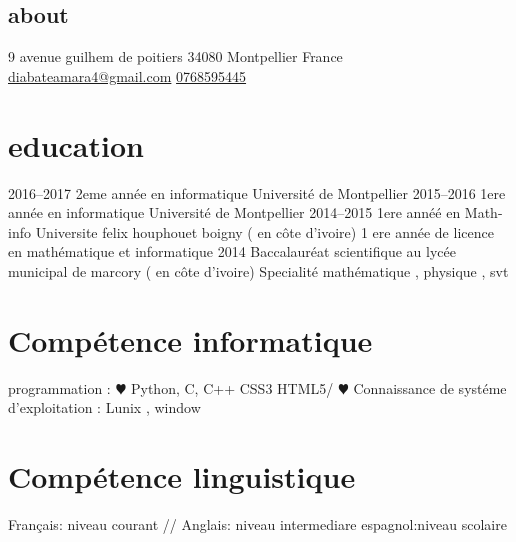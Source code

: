 \documentclass[]{friggeri-cv}
\begin{document}
       {}


\begin{aside}
  \section{about}
    9 avenue guilhem de poitiers
    34080 Montpellier
    France
    ~
    \href{email:}{diabateamara4@gmail.com}
    \href{Téléphone:}{0768595445}
\end{aside}
\section{education}

\begin{entrylist}
  
  \entry
    {2016–2017}
    {2eme année en informatique}
    {Université de Montpellier}
    {}
  \entry
    {2015–2016}
    {1ere année en informatique}
    {Université de Montpellier}
    {}
  \entry
    {2014–2015}
    {1ere annéé en Math-info }
    {Universite felix houphouet boigny ( en côte d'ivoire) }
    {1 ere année de licence en mathématique et informatique  }
  \entry
    {2014}
    { Baccalauréat scientifique }
    { au lycée municipal de marcory ( en côte d'ivoire)}
    {Specialité mathématique , physique , svt }
\end{entrylist}

\section{Compétence informatique }

\begin{entrylist}
  \entry
    {programmation : }
    {\color{red} $\varheartsuit$ 
    Python, C, C++
    CSS3  HTML5}/
    {\color{red} $\varheartsuit$ 
    Connaissance de systéme d'exploitation : Lunix , window}
 
\end{entrylist}

\section{Compétence linguistique}

\begin{entrylist}
  \entry
  {Français: niveau courant} //
  {Anglais: niveau intermediare}
  {espagnol:niveau scolaire }
  
\end{entrylist}
\end{document}
